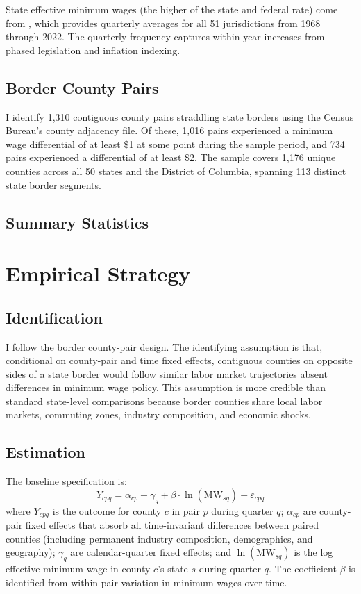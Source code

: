 \documentclass[12pt]{article}
\begin{document}
State effective minimum wages (the higher of the state and federal rate) come from \citet{vaghul2021historical}, which provides quarterly averages for all 51 jurisdictions from 1968 through 2022. The quarterly frequency captures within-year increases from phased legislation and inflation indexing.

\subsection{Border County Pairs}

I identify 1,310 contiguous county pairs straddling state borders using the Census Bureau's county adjacency file. Of these, 1,016 pairs experienced a minimum wage differential of at least \$1 at some point during the sample period, and 734 pairs experienced a differential of at least \$2. The sample covers 1,176 unique counties across all 50 states and the District of Columbia, spanning 113 distinct state border segments.

\subsection{Summary Statistics}




\section{Empirical Strategy}

\subsection{Identification}

I follow the \citet{dube2010minimum} border county-pair design. The identifying assumption is that, conditional on county-pair and time fixed effects, contiguous counties on opposite sides of a state border would follow similar labor market trajectories absent differences in minimum wage policy. This assumption is more credible than standard state-level comparisons because border counties share local labor markets, commuting zones, industry composition, and economic shocks.

\subsection{Estimation}

The baseline specification is:
\begin{equation}
Y_{cpq} = \alpha_{cp} + \gamma_q + \beta \cdot \ln(\text{MW}_{sq}) + \varepsilon_{cpq}
\label{eq:main}
\end{equation}
where $Y_{cpq}$ is the outcome for county $c$ in pair $p$ during quarter $q$; $\alpha_{cp}$ are county-pair fixed effects that absorb all time-invariant differences between paired counties (including permanent industry composition, demographics, and geography); $\gamma_q$ are calendar-quarter fixed effects; and $\ln(\text{MW}_{sq})$ is the log effective minimum wage in county $c$'s state $s$ during quarter $q$. The coefficient $\beta$ is identified from within-pair variation in minimum wages over time.
\end{document}

